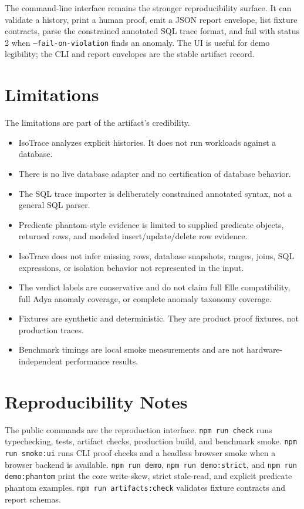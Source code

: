 \documentclass[10pt]{article}
\newcommand{\code}[1]{\texttt{#1}}
\begin{document}
The command-line interface remains the stronger reproducibility surface. It can validate a history, print a human proof, emit a JSON report envelope, list fixture contracts, parse the constrained annotated SQL trace format, and fail with status 2 when \code{--fail-on-violation} finds an anomaly. The UI is useful for demo legibility; the CLI and report envelopes are the stable artifact record.

\section{Limitations}

The limitations are part of the artifact's credibility.

\begin{itemize}
\item IsoTrace analyzes explicit histories. It does not run workloads against a database.
\item There is no live database adapter and no certification of database behavior.
\item The SQL trace importer is deliberately constrained annotated syntax, not a general SQL parser.
\item Predicate phantom-style evidence is limited to supplied predicate objects, returned rows, and modeled insert/update/delete row evidence.
\item IsoTrace does not infer missing rows, database snapshots, ranges, joins, SQL expressions, or isolation behavior not represented in the input.
\item The verdict labels are conservative and do not claim full Elle compatibility, full Adya anomaly coverage, or complete anomaly taxonomy coverage.
\item Fixtures are synthetic and deterministic. They are product proof fixtures, not production traces.
\item Benchmark timings are local smoke measurements and are not hardware-independent performance results.
\end{itemize}

\section{Reproducibility Notes}

The public commands are the reproduction interface. \code{npm run check} runs typechecking, tests, artifact checks, production build, and benchmark smoke. \code{npm run smoke:ui} runs CLI proof checks and a headless browser smoke when a browser backend is available. \code{npm run demo}, \code{npm run demo:strict}, and \code{npm run demo:phantom} print the core write-skew, strict stale-read, and explicit predicate phantom examples. \code{npm run artifacts:check} validates fixture contracts and report schemas.
\end{document}
